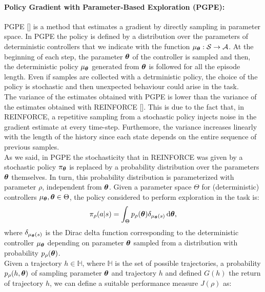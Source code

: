 \paragraph{Policy Gradient with Parameter-Based Exploration (PGPE):} \label{subsec:pgpe}
\ac{PGPE} [\cite{sehnke2008PolicyGradient}] is a method that estimates a gradient by directly sampling in parameter space. In \ac{PGPE} the policy is defined by a distribution over the parameters of deterministic controllers that we indicate with the function $\mu_{\boldsymbol{\theta}}: \mathcal{S} \to \mathcal{A}$. At the beginning of each step, the parameter $\boldsymbol{\theta}$ of the controller is sampled and then, the deterministic policy $\mu_{\boldsymbol{\theta}}$ generated from $\boldsymbol{\theta}$ is followed for all the episode length. Even if samples are collected with a detrministic policy, the choice of the policy is stochastic and then unexpected behaviour could arise in the task.\\
\newline
The variance of the estimates obtained with \ac{PGPE} is lower than the variance of the estimates obtained with REINFORCE [\cite{zhao2013efficient}]. This is due to the fact that, in REINFORCE, a repetitive sampling from a stochastic policy injects noise in the gradient estimate at every time-step. Furthemore, the variance increases linearly with the length of the history since each state depends on the entire sequence of previous samples.\\
\newline
As we said, in \ac{PGPE} the stochasticity that in REINFORCE was given by a stochastic policy $\pi_{\boldsymbol{\theta}}$ is replaced by a probability distribution over the parameters $\boldsymbol{\theta}$ themselves. In turn, this probability distribution is parameterized with parameter $\rho$, independent from $\boldsymbol{\theta}$. Given a parameter space $\Theta$ for (deterministic) controllers $\mu_{\boldsymbol{\theta}}, \boldsymbol{\theta} \in \Theta$, the policy considered to perform exploration in the task is:
\begin{align}
\pi_{\rho}(a|s) = \int_{\Theta} p_{\rho}(\boldsymbol{\theta}) \delta_{\mu_{\boldsymbol{\theta}}(s)}\,\mathrm{d} \boldsymbol{\theta},
\end{align}
where $\delta_{\mu_{\boldsymbol{\theta}}(s)}$ is the Dirac delta function corresponding to the deterministic controller $\mu_{\boldsymbol{\theta}}$ depending on parameter $\boldsymbol{\theta}$ sampled from a distribution with probability $p_{\rho}(\boldsymbol{\theta})$.\\
\newline
Given a trajectory $h \in \mathbb{H}$, where $\mathbb{H}$ is the set of possible trajectories, a probability $p_{\rho}(h, \boldsymbol{\theta})$ of sampling parameter $\boldsymbol{\theta}$ and trajectory $h$ and defined $G(h)$ the return of trajectory $h$, we can define a suitable performance measure $J(\rho)$ as:
